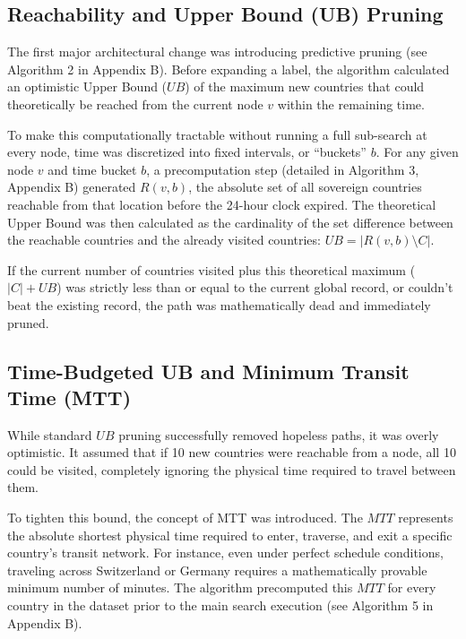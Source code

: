 \subsection{Reachability and Upper Bound (UB) Pruning}
\label{subsec:baseline_label_setting}

The first major architectural change was introducing predictive pruning (see Algorithm 2 in Appendix B). Before expanding a label, the algorithm calculated an optimistic Upper Bound ($UB$) of the maximum new countries that could theoretically be reached from the current node $v$ within the remaining time.

\medskip

To make this computationally tractable without running a full sub-search at every node, time was discretized into fixed intervals, or ``buckets'' $b$. For any given node $v$ and time bucket $b$, a precomputation step (detailed in Algorithm 3, Appendix B) generated $R(v, b)$, the absolute set of all sovereign countries reachable from that location before the 24-hour clock expired. The theoretical Upper Bound was then calculated as the cardinality of the set difference between the reachable countries and the already visited countries: $UB = |R(v, b) \setminus C|$.

\medskip

If the current number of countries visited plus this theoretical maximum ($|C| + UB$) was strictly less than or equal to the current global record, or couldn't beat the existing record, the path was mathematically dead and immediately pruned.

\subsection{Time-Budgeted UB and Minimum Transit Time (MTT)}
\label{subsec:ub_pruning}

While standard $UB$ pruning successfully removed hopeless paths, it was overly optimistic. It assumed that if 10 new countries were reachable from a node, all 10 could be visited, completely ignoring the physical time required to travel between them.

\medskip

To tighten this bound, the concept of MTT was introduced. The $MTT$ represents the absolute shortest physical time required to enter, traverse, and exit a specific country's transit network. For instance, even under perfect schedule conditions, traveling across Switzerland or Germany requires a mathematically provable minimum number of minutes. The algorithm precomputed this $MTT$ for every country in the dataset prior to the main search execution (see Algorithm 5 in Appendix B).

